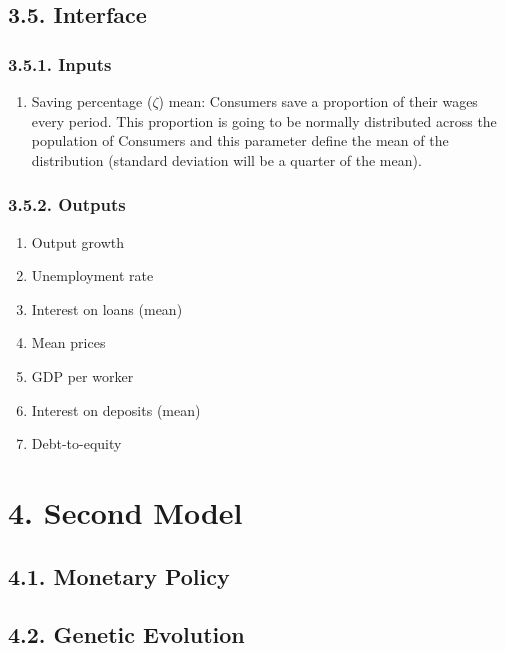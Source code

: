 \documentclass[11pt,]{article}
\providecommand{\tightlist}{%
\setlength{\itemsep}{0pt}\setlength{\parskip}{0pt}}
\begin{document}
\subsection{3.5. Interface}\label{interface}

\subsubsection{3.5.1. Inputs}\label{inputs}

\begin{enumerate}
\def\labelenumi{\arabic{enumi}.}
\tightlist
\item
  Saving percentage (\(\zeta\)) mean: Consumers save a proportion of
  their wages every period. This proportion is going to be normally
  distributed across the population of Consumers and this parameter
  define the mean of the distribution (standard deviation will be a
  quarter of the mean).
\end{enumerate}

\subsubsection{3.5.2. Outputs}\label{outputs}

\begin{enumerate}
\def\labelenumi{\arabic{enumi}.}
\tightlist
\item
  Output growth
\item
  Unemployment rate
\item
  Interest on loans (mean)
\item
  Mean prices
\item
  GDP per worker
\item
  Interest on deposits (mean)
\item
  Debt-to-equity
\end{enumerate}

\section{4. Second Model}\label{second-model}

\subsection{4.1. Monetary Policy}\label{monetary-policy}

\subsection{4.2. Genetic Evolution}\label{genetic-evolution}
\end{document}
